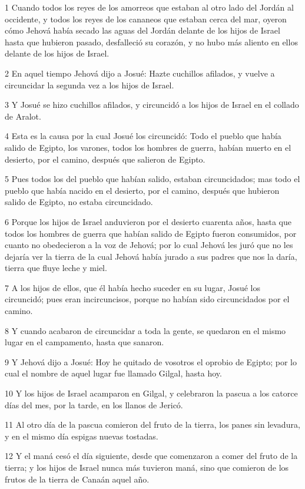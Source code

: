 \par 1 Cuando todos los reyes de los amorreos que estaban al otro lado del Jordán al occidente, y todos los reyes de los cananeos que estaban cerca del mar, oyeron cómo Jehová había secado las aguas del Jordán delante de los hijos de Israel hasta que hubieron pasado, desfalleció su corazón, y no hubo más aliento en ellos delante de los hijos de Israel.
\par 2 En aquel tiempo Jehová dijo a Josué: Hazte cuchillos afilados, y vuelve a circuncidar la segunda vez a los hijos de Israel.
\par 3 Y Josué se hizo cuchillos afilados, y circuncidó a los hijos de Israel en el collado de Aralot.
\par 4 Esta es la causa por la cual Josué los circuncidó: Todo el pueblo que había salido de Egipto, los varones, todos los hombres de guerra, habían muerto en el desierto, por el camino, después que salieron de Egipto.
\par 5 Pues todos los del pueblo que habían salido, estaban circuncidados; mas todo el pueblo que había nacido en el desierto, por el camino, después que hubieron salido de Egipto, no estaba circuncidado.
\par 6 Porque los hijos de Israel anduvieron por el desierto cuarenta años, hasta que todos los hombres de guerra que habían salido de Egipto fueron consumidos, por cuanto no obedecieron a la voz de Jehová; por lo cual Jehová les juró que no les dejaría ver la tierra de la cual Jehová había jurado a sus padres que nos la daría, tierra que fluye leche y miel. 
\par 7 A los hijos de ellos, que él había hecho suceder en su lugar, Josué los circuncidó; pues eran incircuncisos, porque no habían sido circuncidados por el camino.
\par 8 Y cuando acabaron de circuncidar a toda la gente, se quedaron en el mismo lugar en el campamento, hasta que sanaron.
\par 9 Y Jehová dijo a Josué: Hoy he quitado de vosotros el oprobio de Egipto; por lo cual el nombre de aquel lugar fue llamado Gilgal, hasta hoy.
\par 10 Y los hijos de Israel acamparon en Gilgal, y celebraron la pascua a los catorce días del mes, por la tarde, en los llanos de Jericó.
\par 11 Al otro día de la pascua comieron del fruto de la tierra, los panes sin levadura, y en el mismo día espigas nuevas tostadas.
\par 12 Y el maná cesó el día siguiente, desde que comenzaron a comer del fruto de la tierra; y los hijos de Israel nunca más tuvieron maná, sino que comieron de los frutos de la tierra de Canaán aquel año.

